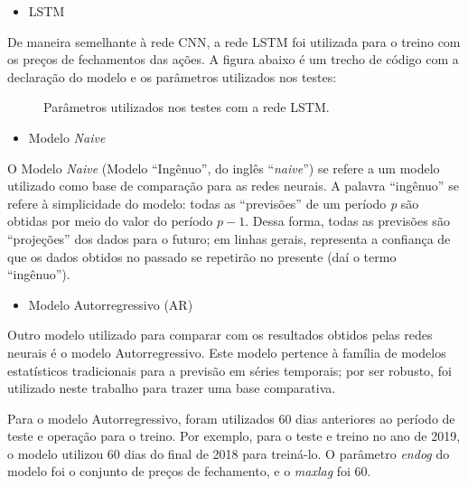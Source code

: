 \begin{itemize}
\item{LSTM}
\end{itemize}

\par
De maneira semelhante à rede CNN, a rede LSTM foi utilizada para o treino com os preços de fechamentos das ações. A figura abaixo é um trecho de código com a declaração do modelo e os parâmetros utilizados nos testes:


\begin{figure}[H]
\caption{Parâmetros utilizados nos testes com a rede LSTM.}

\end{figure}


\begin{itemize}
\item{Modelo \textit{Naive}}
\end{itemize}

\par
O Modelo \textit{Naive} (Modelo “Ingênuo”, do inglês “\textit{naive}”) se refere a um modelo utilizado como base de comparação para as redes neurais. A palavra “ingênuo” se refere à simplicidade do modelo: todas as “previsões” de um período \textit{p} são obtidas por meio do valor do período $p-1$. Dessa forma, todas as previsões são “projeções” dos dados para o futuro; em linhas gerais, representa a confiança de que os dados obtidos no passado se repetirão no presente (daí o termo “ingênuo”).

\begin{itemize}
\item{Modelo Autorregressivo (AR)}
\end{itemize}

\par
Outro modelo utilizado para comparar com os resultados obtidos pelas redes neurais é o modelo Autorregressivo. Este modelo pertence à família de modelos estatísticos tradicionais para a previsão em séries temporais; por ser robusto, foi utilizado neste trabalho para trazer uma base comparativa.

\par
Para o modelo Autorregressivo, foram utilizados 60 dias anteriores ao período de teste e operação para o treino. Por exemplo, para o teste e treino no ano de 2019, o modelo utilizou 60 dias do final de 2018 para treiná-lo. O parâmetro \textit{endog} do modelo foi o conjunto de preços de fechamento, e o \textit{maxlag} foi 60.

